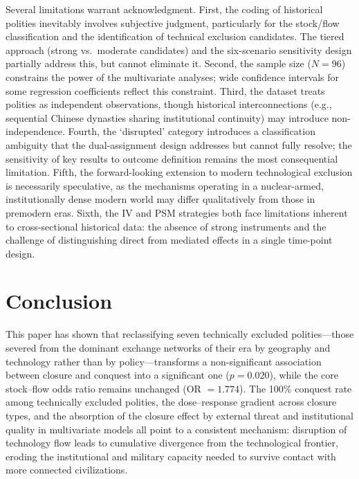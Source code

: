 \documentclass[pdflatex,sn-basic]{sn-jnl}
\theoremstyle{thmstyleone}%
\theoremstyle{thmstyletwo}%
\theoremstyle{thmstylethree}%
\begin{document}
Several limitations warrant acknowledgment. First, the coding of historical polities inevitably involves subjective judgment, particularly for the stock/flow classification and the identification of technical exclusion candidates. The tiered approach (strong vs.\ moderate candidates) and the six-scenario sensitivity design partially address this, but cannot eliminate it. Second, the sample size ($N = 96$) constrains the power of the multivariate analyses; wide confidence intervals for some regression coefficients reflect this constraint. Third, the dataset treats polities as independent observations, though historical interconnections (e.g., sequential Chinese dynasties sharing institutional continuity) may introduce non-independence. Fourth, the `disrupted' category introduces a classification ambiguity that the dual-assignment design addresses but cannot fully resolve; the sensitivity of key results to outcome definition remains the most consequential limitation. Fifth, the forward-looking extension to modern technological exclusion is necessarily speculative, as the mechanisms operating in a nuclear-armed, institutionally dense modern world may differ qualitatively from those in premodern eras. Sixth, the IV and PSM strategies both face limitations inherent to cross-sectional historical data: the absence of strong instruments and the challenge of distinguishing direct from mediated effects in a single time-point design.

\section{Conclusion}\label{sec:conclusion}

This paper has shown that reclassifying seven technically excluded polities---those severed from the dominant exchange networks of their era by geography and technology rather than by policy---transforms a non-significant association between closure and conquest into a significant one ($p = 0.020$), while the core stock--flow odds ratio remains unchanged (OR $= 1.774$). The 100\% conquest rate among technically excluded polities, the dose--response gradient across closure types, and the absorption of the closure effect by external threat and institutional quality in multivariate models all point to a consistent mechanism: disruption of technology flow leads to cumulative divergence from the technological frontier, eroding the institutional and military capacity needed to survive contact with more connected civilizations.
\end{document}

